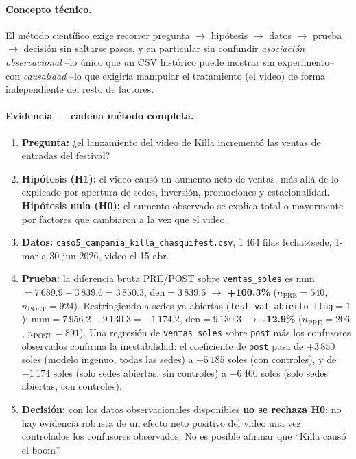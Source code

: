 \paragraph{Concepto técnico.} El método científico exige recorrer pregunta $\to$ hipótesis $\to$ datos $\to$ prueba $\to$ decisión sin saltarse pasos, y en particular sin confundir \emph{asociación observacional} --lo único que un CSV histórico puede mostrar sin experimento-- con \emph{causalidad} --lo que exigiría manipular el tratamiento (el video) de forma independiente del resto de factores.

\paragraph{Evidencia --- cadena método completa.}
\begin{enumerate}
  \item \textbf{Pregunta:} ¿el lanzamiento del video de Killa incrementó las ventas de entradas del festival?
  \item \textbf{Hipótesis (H1):} el video causó un aumento neto de ventas, más allá de lo explicado por apertura de sedes, inversión, promociones y estacionalidad. \textbf{Hipótesis nula (H0):} el aumento observado se explica total o mayormente por factores que cambiaron a la vez que el video.
  \item \textbf{Datos:} \texttt{caso5\_campania\_killa\_chasquifest.csv}, 1\,464 filas fecha$\times$sede, 1-mar a 30-jun 2026, video el 15-abr.
  \item \textbf{Prueba:} la diferencia bruta PRE/POST sobre \texttt{ventas\_soles} es num$=7\,689.9-3\,839.6=3\,850.3$, den$=3\,839.6$ $\to$ \textbf{+100.3\%} ($n_{\text{PRE}}=540$, $n_{\text{POST}}=924$). Restringiendo a sedes ya abiertas (\texttt{festival\_abierto\_flag}$=1$): num$=7\,956.2-9\,130.3=-1\,174.2$, den$=9\,130.3$ $\to$ \textbf{-12.9\%} ($n_{\text{PRE}}=206$, $n_{\text{POST}}=891$). Una regresión de \texttt{ventas\_soles} sobre \texttt{post} más los confusores observados confirma la inestabilidad: el coeficiente de \texttt{post} pasa de $+3\,850$ soles (modelo ingenuo, todas las sedes) a $-5\,185$ soles (con controles), y de $-1\,174$ soles (solo sedes abiertas, sin controles) a $-6\,460$ soles (solo sedes abiertas, con controles).
  \item \textbf{Decisión:} con los datos observacionales disponibles \textbf{no se rechaza H0}: no hay evidencia robusta de un efecto neto positivo del video una vez controlados los confusores observados. No es posible afirmar que ``Killa causó el boom''.
\end{enumerate}

